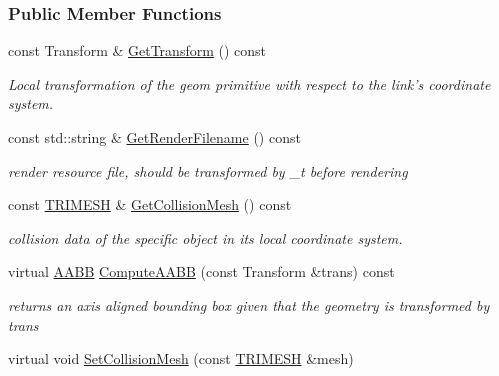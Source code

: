 \subsubsection*{Public Member Functions}
\begin{DoxyCompactItemize}
\item 
\hypertarget{classOpenRAVE_1_1KinBody_1_1Link_1_1GEOMPROPERTIES_aaf48415e05caa5f9a9c3fa88cb8ed8a9}{
const Transform \& \hyperlink{classOpenRAVE_1_1KinBody_1_1Link_1_1GEOMPROPERTIES_aaf48415e05caa5f9a9c3fa88cb8ed8a9}{GetTransform} () const }
\label{classOpenRAVE_1_1KinBody_1_1Link_1_1GEOMPROPERTIES_aaf48415e05caa5f9a9c3fa88cb8ed8a9}

\begin{DoxyCompactList}\small\item\em Local transformation of the geom primitive with respect to the link's coordinate system. \item\end{DoxyCompactList}\item 
const std::string \& \hyperlink{classOpenRAVE_1_1KinBody_1_1Link_1_1GEOMPROPERTIES_a4474cb22f6457503715435d2f3e34496}{GetRenderFilename} () const 
\begin{DoxyCompactList}\small\item\em render resource file, should be transformed by \_\-t before rendering \item\end{DoxyCompactList}\item 
const \hyperlink{classOpenRAVE_1_1KinBody_1_1Link_1_1TRIMESH}{TRIMESH} \& \hyperlink{classOpenRAVE_1_1KinBody_1_1Link_1_1GEOMPROPERTIES_a387688dd5bde34a4dd34be211886a8d1}{GetCollisionMesh} () const 
\begin{DoxyCompactList}\small\item\em collision data of the specific object in its local coordinate system. \item\end{DoxyCompactList}\item 
\hypertarget{classOpenRAVE_1_1KinBody_1_1Link_1_1GEOMPROPERTIES_a17d17302d5a602a234230b12323618f9}{
virtual \hyperlink{classOpenRAVE_1_1geometry_1_1aabb}{AABB} \hyperlink{classOpenRAVE_1_1KinBody_1_1Link_1_1GEOMPROPERTIES_a17d17302d5a602a234230b12323618f9}{ComputeAABB} (const Transform \&trans) const }
\label{classOpenRAVE_1_1KinBody_1_1Link_1_1GEOMPROPERTIES_a17d17302d5a602a234230b12323618f9}

\begin{DoxyCompactList}\small\item\em returns an axis aligned bounding box given that the geometry is transformed by trans \item\end{DoxyCompactList}\item 
\hypertarget{classOpenRAVE_1_1KinBody_1_1Link_1_1GEOMPROPERTIES_a3e5d551673c42bb134bf843946a0403b}{
virtual void \hyperlink{classOpenRAVE_1_1KinBody_1_1Link_1_1GEOMPROPERTIES_a3e5d551673c42bb134bf843946a0403b}{SetCollisionMesh} (const \hyperlink{classOpenRAVE_1_1KinBody_1_1Link_1_1TRIMESH}{TRIMESH} \&mesh)}
\label{classOpenRAVE_1_1KinBody_1_1Link_1_1GEOMPROPERTIES_a3e5d551673c42bb134bf843946a0403b}


\end{DoxyCompactItemize}
